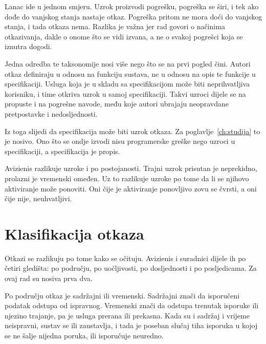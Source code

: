 Lanac ide u jednom smjeru. Uzrok proizvodi pogrešku, pogreška se širi, i
tek ako dođe do vanjskog stanja nastaje otkaz. Pogreška pritom ne mora doći
do vanjskog stanja, i tada otkaza nema. Razlika je važna jer rad
govori o načinima otkazivanja, dakle o onome što se vidi izvana, a ne o
svakoj pogrešci koja se iznutra dogodi.

Jedna odredba te taksonomije nosi više nego što se na prvi pogled čini.
Autori otkaz definiraju u odnosu na funkciju sustava, ne u odnosu na opis
te funkcije u specifikaciji. Usluga koja je u skladu sa specifikacijom
može biti neprihvatljiva korisniku, i time otkriva uzrok u samoj
specifikaciji. Takvi uzroci dijele se na propuste i na pogrešne navode,
među koje autori ubrajaju neopravdane pretpostavke i nedosljednosti.

Iz toga slijedi da specifikacija može biti uzrok otkaza. Za
poglavlje~\ref{ch:studija} to je nosivo. Ono što se ondje izvodi nisu
programerske greške nego uzroci u specifikaciji, a specifikacija je propis.

Avizienis razlikuje uzroke i po postojanosti. Trajni uzrok prisutan je
neprekidno, prolazni je vremenski omeđen. Uz to razlikuje uzroke po tome
da li se njihovo aktiviranje može ponoviti. Oni čije je aktiviranje
ponovljivo zovu se čvrsti, a oni čije nije, neuhvatljivi.

\section{Klasifikacija otkaza}
\label{sec:klasifikacija-otkaza}

Otkazi se razlikuju po tome kako se očituju. Avizienis i suradnici dijele
ih po četiri gledišta: po području, po uočljivosti, po dosljednosti i po
posljedicama\cite{avizienis2004taxonomy}. Za ovaj rad su nosiva prva dva.

Po području otkaz je sadržajni ili vremenski. Sadržajni znači da isporučeni
podatak odstupa od ispravnog. Vremenski znači da odstupa trenutak isporuke
ili njezino trajanje, pa je usluga prerana ili prekasna. Kada su i sadržaj
i vrijeme neispravni, sustav se ili zaustavlja, i tada je poseban slučaj
tiha isporuka u kojoj se ne šalje nijedna poruka, ili isporučuje neuredno.

